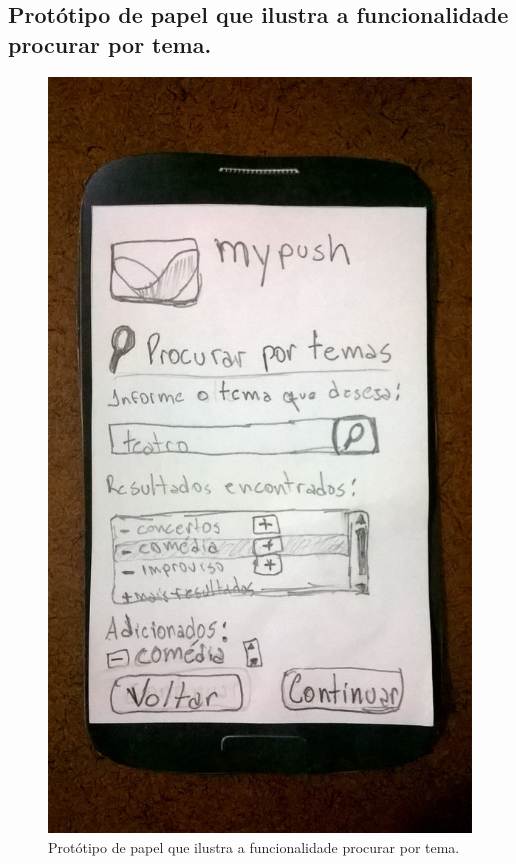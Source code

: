 \begin{apendicesenv}
    \pagebreak
    \section*{Protótipo de papel que ilustra a funcionalidade procurar por tema.}
    
      \begin{figure}[!htbp]
	\centering
	\includegraphics[scale=0.32, angle=-90]{editaveis/figuras/prototipo_papel_v1/procurar_por_temas}
	\caption{Protótipo de papel que ilustra a funcionalidade procurar por tema.}
	\label{procurar_por_temas_v1}
      \end{figure}
    

\end{apendicesenv}

